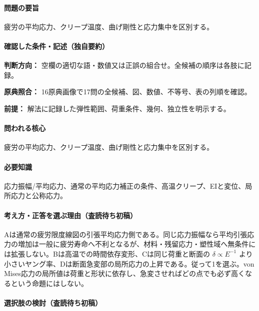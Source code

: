 \paragraph{問題の要旨} 疲労の平均応力、クリープ温度、曲げ剛性と応力集中を区別する。

\paragraph{確認した条件・記述（独自要約）}\mbox{}\par

\noindent\textbf{判断方向：} 空欄の適切な語・数値又は正誤の組合せ。全候補の順序は各肢に記録。\par

\noindent\textbf{原典照合：} 16原典画像で17問の全候補、図、数値、不等号、表の列順を確認。\par

\noindent\textbf{前提：} 解法に記録した弾性範囲、荷重条件、幾何、独立性を明示する。\par

\paragraph{問われる核心} 疲労の平均応力、クリープ温度、曲げ剛性と応力集中を区別する。

\paragraph{必要知識} 応力振幅/平均応力、通常の平均応力補正の条件、高温クリープ、EIと変位、局所応力と公称応力。

\paragraph{考え方・正答を選ぶ理由（査読待ち初稿）} Aは通常の疲労限度線図の引張平均応力側である。同じ応力振幅なら平均引張応力の増加は一般に疲労寿命へ不利となるが、材料・残留応力・塑性域へ無条件には拡張しない。Bは高温での時間依存変形、Cは同じ荷重と断面の \(\delta\propto E^{-1}\) より小さいヤング率、Dは断面急変部の局所応力の上昇である。従って1を選ぶ。von Mises応力の局所値は荷重と形状に依存し、急変させればどの点でも必ず高くなるという命題にはしない。

\paragraph{選択肢の検討（査読待ち初稿）}\mbox{}\par

